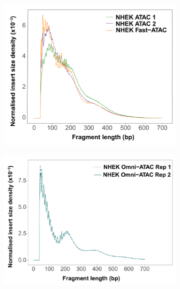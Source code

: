  

\begin{figure}[htbp]
\centering
\begin{subfigure}{0.48\textwidth}
\centering
\includegraphics[width=\textwidth]{./Results1/pdfs/ATAC_NHEK_ATAC1_ATAC2_FAST_ATAC_fragment_size_distribution}
\caption{\textbf{}}
\end{subfigure}%
\begin{subfigure}{0.48\textwidth}
\centering
\includegraphics[width=\textwidth]{./Results1/pdfs/ATAC_NHEK_Omni_ATAC_fragment_size_distribution}
\caption{\textbf{}}
\end{subfigure}
\begin{subfigure}{0.5\textwidth}

\end{subfigure}
\end{figure}
